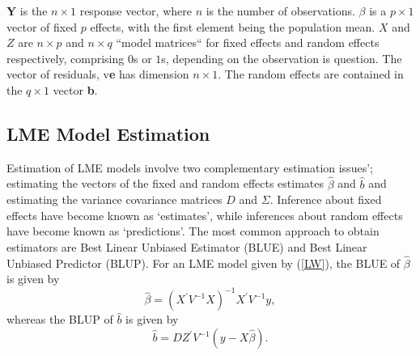 \documentclass[12pt, a4paper]{report}
\theoremstyle{plain}
\theoremstyle{definition}
\theoremstyle{remark}
\begin{document}
			\textbf{Y} is the $n
			\times 1$ response vector, where  $n$ is the number of observations. \textbf{$\beta$} is a $p \times 1$ vector of fixed $p$ effects, with the
			first element being the population mean. $X$ and $Z$ are $n \times p$ and $n \times q$ ``model matrices`` for fixed effects and random effects respectively, comprising
			$0$s or $1$s, depending on the observation is question. The vector of residuals, v\textbf{e} has
			dimension $n \times 1$. The random effects are contained in the  $q \times
			1$ vector \textbf{b}.
			
			
			
			
			
			\subsection{LME Model Estimation}
			Estimation of LME models involve two complementary estimation issues'; estimating the vectors of the fixed and random effects estimates $\hat{\beta}$ and $\hat{b}$ and estimating the variance covariance matrices $D$ and $\Sigma$.
			Inference about fixed effects have become known as `estimates', while inferences about random effects have become known as `predictions'. The most common approach to obtain estimators are Best Linear Unbiased Estimator (BLUE) and Best Linear Unbiased Predictor (BLUP). For an LME model given by (\ref{LW}), the BLUE of $\hat{\beta}$ is given by
			\[\hat{\beta} = (X^\prime V^{-1}X)^{-1}X^\prime V^{-1}y,\]whereas the BLUP of $\hat{b}$ is given by
			\[\hat{b} = DZ^{\prime} V^{-1} (y-X\hat{\beta}).\]
			
\end{document}
